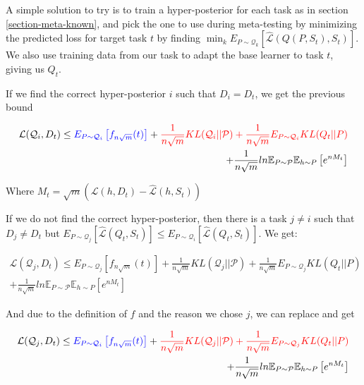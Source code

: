 \documentclass[letterpaper]{article}
\theoremstyle{definition}
\begin{document}
A simple solution to try is to train a hyper-posterior for each task as in section \ref{section-meta-known}, and pick the one to use during meta-testing by minimizing the predicted loss for target task $t$ by finding $\min_{k}E_{P\sim\mathcal{Q}_k}\left [\hat{\mathcal{L}}(Q(P,S_t), S_t)\right ]$.
We also use training data from our task to adapt the base learner to task $t$, giving us $Q_t$.


If we find the correct hyper-posterior $i$ such that $D_i=D_t$, we get the previous bound

\begin{equation*}
\begin{split}
\mathcal{L}(\mathcal{Q}_i, D_t)\leq \textcolor{blue}{ E_{P\sim \mathcal{Q}_i} \left [ f_{n\sqrt{m}}(t)\right ]} + \textcolor{red}{\frac{1}{n\sqrt{m}} KL(\mathcal{Q}_i||\mathcal{P}) +\frac{1}{n\sqrt{m}}E_{P\sim \mathcal{Q}_i} KL(Q_t||P)} \\+ \frac{1}{n\sqrt{m}} ln\mathbb{E}_{P\sim \mathcal{P}}\mathbb{E}_{h\sim P}\left [ e^{nM_t} \right ]
\end{split}
\end{equation*}

Where $M_t=\sqrt{m}(\mathcal{L}(h, D_t)-\hat{\mathcal{L}}(h,S_t))$

If we do not find the correct hyper-posterior, then there is a task $j\neq i$ such that $D_j\neq D_t$ but $E_{P\sim\mathcal{Q}_j}\left [\hat{\mathcal{L}}(Q_t, S_t)\right ]\leq E_{P\sim\mathcal{Q}_i}\left [\hat{\mathcal{L}}(Q_t, S_t)\right ]$. We get:

\begin{equation*}
\begin{split}
\mathcal{L}(\mathcal{Q}_j, D_t)\leq E_{P\sim \mathcal{Q}_j} \left [ f_{n\sqrt{m}}(t)\right ] + \frac{1}{n\sqrt{m}} KL(\mathcal{Q}_j||\mathcal{P}) +\frac{1}{n\sqrt{m}}E_{P\sim \mathcal{Q}_j} KL(Q_t||P) \\+ \frac{1}{n\sqrt{m}} ln\mathbb{E}_{P\sim \mathcal{P}}\mathbb{E}_{h\sim P}\left [ e^{nM_t} \right ]
\end{split}
\end{equation*}

And due to the definition of $f$ and the reason we chose $j$, we can replace and get 

\begin{equation*}
\begin{split}
\mathcal{L}(\mathcal{Q}_j, D_t)\leq \textcolor{blue}{E_{P\sim \mathcal{Q}_i} \left [ f_{n\sqrt{m}}(t)\right ]} + \textcolor{red}{\frac{1}{n\sqrt{m}} KL(\mathcal{Q}_j||\mathcal{P}) +\frac{1}{n\sqrt{m}}E_{P\sim \mathcal{Q}_j} KL(Q_t||P)} \\+ \frac{1}{n\sqrt{m}} ln\mathbb{E}_{P\sim \mathcal{P}}\mathbb{E}_{h\sim P}\left [ e^{nM_t} \right ]
\end{split}
\end{equation*}
\end{document}
